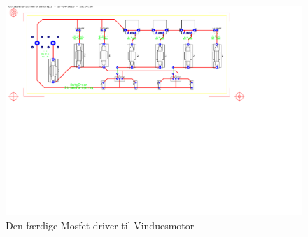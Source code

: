 \begin{figure}[h]
\centering 
\includegraphics[width={\textwidth}, trim=0 0 0 0, clip=true] {../fig/ultiboard_stroemforsyning.pdf} %
\caption{Den færdige Mosfet driver til Vinduesmotor}
\label{fig:vinduesmotor_print}
\end{figure}

\clearpage
